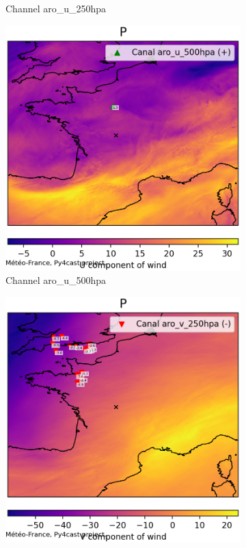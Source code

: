 \begin{figure}[h]
\begin{subfigure}[b]{0.44\textwidth}
        \caption{Channel aro\_u\_250hpa}
    \end{subfigure}
    \hfill
    \begin{subfigure}[b]{0.44\textwidth}
        \includegraphics[width=\textwidth]{Images/titan_rain_anchors/nov-21/complete/2023112100_feature_aro_u_500hpa.png}
        \caption{Channel aro\_u\_500hpa}
    \end{subfigure}
    \hfill
    \begin{subfigure}[b]{0.44\textwidth}
        \includegraphics[width=\textwidth]{Images/titan_rain_anchors/nov-21/complete/2023112100_feature_aro_v_250hpa.png}

\end{subfigure}
\end{figure}

